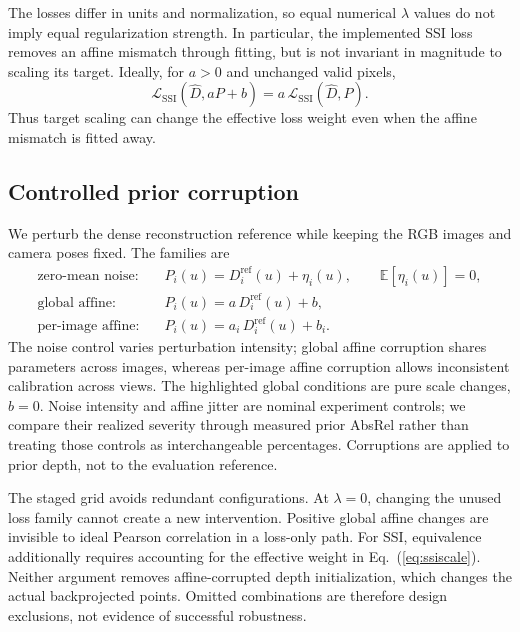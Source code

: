 \documentclass[10pt,a4paper]{article}
\begin{document}
The losses differ in units and normalization, so equal numerical $\lambda$ values do
not imply equal regularization strength. In particular, the implemented SSI loss
removes an affine mismatch through fitting, but is not invariant in magnitude to
scaling its target. Ideally, for $a>0$ and unchanged valid pixels,
\begin{equation}\label{eq:ssiscale}
\mathcal{L}_{\mathrm{SSI}}(\widehat{D},aP+b)=a\,\mathcal{L}_{\mathrm{SSI}}(\widehat{D},P).
\end{equation}
Thus target scaling can change the effective loss weight even when the affine
mismatch is fitted away.

\subsection{Controlled prior corruption}

We perturb the dense reconstruction reference while keeping the RGB images and camera
poses fixed. The families are
\begin{align}
\text{zero-mean noise:}\quad & P_i(u)=D_i^{\mathrm{ref}}(u)+\eta_i(u),\qquad \mathbb{E}[\eta_i(u)]=0,\\
\text{global affine:}\quad & P_i(u)=a\,D_i^{\mathrm{ref}}(u)+b,\\
\text{per-image affine:}\quad & P_i(u)=a_i\,D_i^{\mathrm{ref}}(u)+b_i.
\end{align}
The noise control varies perturbation intensity; global affine corruption shares
parameters across images, whereas per-image affine corruption allows inconsistent
calibration across views. The highlighted global conditions are pure scale changes,
$b=0$. Noise intensity and affine jitter are nominal experiment controls; we compare
their realized severity through measured prior AbsRel rather than treating those
controls as interchangeable percentages. Corruptions are applied to prior depth, not
to the evaluation reference.

The staged grid avoids redundant configurations. At $\lambda=0$, changing the unused
loss family cannot create a new intervention. Positive global affine changes are
invisible to ideal Pearson correlation in a loss-only path. For SSI, equivalence
additionally requires accounting for the effective weight in Eq.~(\ref{eq:ssiscale}).
Neither argument removes affine-corrupted depth initialization, which changes the
actual backprojected points. Omitted combinations are therefore design exclusions,
not evidence of successful robustness.
\end{document}
